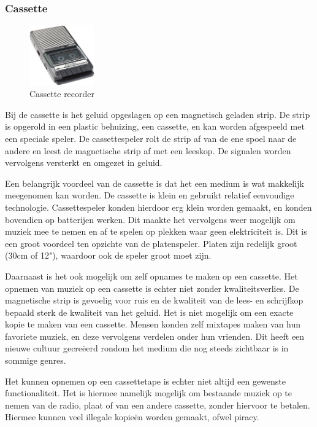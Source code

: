 \subsubsection*{Cassette}
\begin{figure}
    \centering
    \includegraphics[width=0.25\textwidth]{assets/critical-review/Tape.jpg}
    \caption{Cassette recorder}
    \label{fig:critical-review:tape}
\end{figure}
Bij de cassette is het geluid opgeslagen op een magnetisch geladen strip. De strip is opgerold in een plastic behuizing, een cassette, en kan worden afgespeeld met een speciale speler. De cassettespeler rolt de strip af van de ene spoel naar de andere en leest de magnetische strip af met een leeskop. De signalen worden vervolgens versterkt en omgezet in geluid.

Een belangrijk voordeel van de cassette is dat het een medium is wat makkelijk meegenomen kan worden. De cassette is klein en gebruikt relatief eenvoudige technologie. Cassettespeler konden hierdoor erg klein worden gemaakt, en konden bovendien op batterijen werken. Dit maakte het vervolgens weer mogelijk om muziek mee te nemen en af te spelen op plekken waar geen elektriciteit is. Dit is een groot voordeel ten opzichte van de platenspeler. Platen zijn redelijk groot (30cm of 12"), waardoor ook de speler groot moet zijn.

Daarnaast is het ook mogelijk om zelf opnames te maken op een cassette. Het opnemen van muziek op een cassette is echter niet zonder kwaliteitsverlies. De magnetische strip is gevoelig voor ruis en de kwaliteit van de lees- en schrijfkop bepaald sterk de kwaliteit van het geluid. Het is niet mogelijk om een exacte kopie te maken van een cassette. Mensen konden zelf mixtapes maken van hun favoriete muziek, en deze vervolgens verdelen onder hun vrienden. Dit heeft een nieuwe cultuur gecreëerd rondom het medium die nog steeds zichtbaar is in sommige genres.

Het kunnen opnemen op een cassettetape is echter niet altijd een gewenste functionaliteit. Het is hiermee namelijk mogelijk om bestaande muziek op te nemen van de radio, plaat of van een andere cassette, zonder hiervoor te betalen. Hiermee kunnen veel illegale kopieën worden gemaakt, ofwel piracy. 

